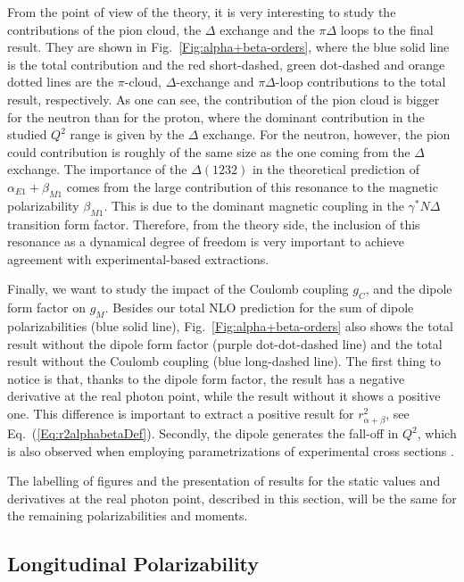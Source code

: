 \documentclass[twocolumn,prc,showpacs,nofootinbib,preprintnumbers,amsmath,amssymb,superscriptaddress]{revtex4-1}
\begin{document}
From the point of view of the theory, it is very interesting to study the contributions of the pion cloud, the $\Delta$ exchange and the $\pi \Delta$ loops to the final result. 
They are shown in Fig.~\ref{Fig:alpha+beta-orders}, where the blue solid line is the total contribution and the red short-dashed, green dot-dashed and orange dotted lines are the $\pi$-cloud, $\Delta$-exchange and $\pi \Delta$-loop contributions to the total result, respectively.
As one can see, the contribution of the pion cloud is bigger for the neutron than for the proton, where the dominant contribution in the studied $Q^2$ range is given by the $\Delta$ exchange. 
For the neutron, however, the pion could contribution is roughly of the same size as the one coming from the $\Delta$ exchange.
The importance of the $\Delta(1232)$ in the theoretical prediction of $\alpha_{E1}+\beta_{M1}$ comes from the large contribution of this resonance to the magnetic polarizability $\beta_{M1}$. This is due to the dominant magnetic coupling in the $\gamma^* N \Delta$ transition form factor. 
Therefore, from the theory side, the inclusion of this resonance as a dynamical degree of freedom is very important to achieve agreement with experimental-based extractions.


Finally, we want to study the impact of the Coulomb coupling $g_C$, and the dipole form factor on $g_M$. Besides our total NLO prediction for the sum of dipole polarizabilities (blue solid line), Fig.~\ref{Fig:alpha+beta-orders} also shows the total result without the dipole form factor (purple dot-dot-dashed line) and the total result without the Coulomb coupling (blue long-dashed line). The first thing to notice is that, thanks to the dipole form factor, the result has a negative derivative at the real photon point, while the result without it shows a positive one. 
 This difference is important to extract a positive result for $r_{\alpha+\beta}^2$, see Eq.~(\ref{Eq:r2alphabetaDef}).
 Secondly, the dipole generates the fall-off in $Q^2$, which is also observed when employing parametrizations of experimental cross sections \cite{Hall:2014lea}.
 

The labelling of figures and the presentation of results for the static values and derivatives at the real photon point, described in this section, will be the same for the remaining polarizabilities and moments.


\subsection{Longitudinal Polarizability}
\end{document}
